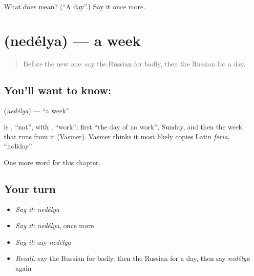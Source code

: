 \begin{tcolorbox}[breakable,colback=teal!4,colframe=teal!35!black,title={Before you move on}]
What does  mean? (\textquotedblleft{}A day\textquotedblright{}.) Say it once more.
\end{tcolorbox}
\section[\texorpdfstring{\ru{неделя} (nedélya)}{неделя (nedélya)}]{ (nedélya) — a week}

\label{lesson:RU-C68-week}



\begin{quote}
Before the new one: say the Russian for badly, then the Russian for a day.
\end{quote}

\subsection*{You'll want to know: }
\textbf{} (\emph{nedélya}) — \textquotedblleft{}a week\textquotedblright{}.

\begin{cousinweb}
\textbf{} is \emph{}, \textquotedblleft{}not\textquotedblright{}, with \emph{}, \textquotedblleft{}work\textquotedblright{}: first \textquotedblleft{}the day of no work\textquotedblright{}, Sunday, and then the week that runs from it (Vasmer). Vasmer thinks it most likely copies Latin \emph{fēria}, \textquotedblleft{}holiday\textquotedblright{}.
\end{cousinweb}

\begin{grammarlens}[title={What you've built}]
One more word for this chapter.
\end{grammarlens}

\subsection*{Your turn}
\begin{itemize}
\raggedright
  \item \emph{Say it:} \emph{nedélya}
  \item \emph{Say it:} \emph{nedélya}, once more
  \item \emph{Say it:} say \emph{nedélya}
  \item \emph{Recall:} say the Russian for badly, then the Russian for a day, then say \emph{nedélya} again
\end{itemize}

